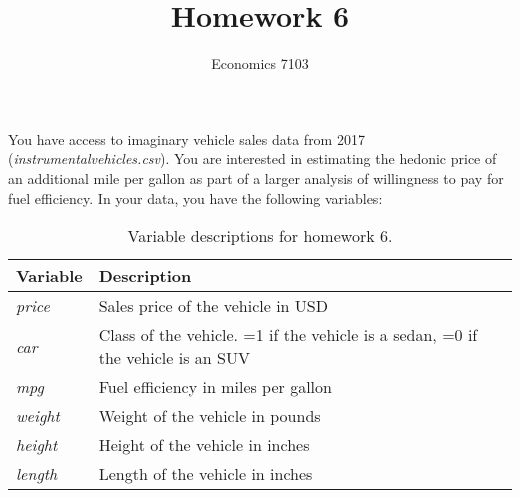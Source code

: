 \documentclass{article}
\title{Homework 6}
\author{Economics 7103}
\date{ }
\begin{document}
\maketitle

\noindent You have access to imaginary vehicle sales data from 2017 (\textit{instrumentalvehicles.csv}).  You are interested in estimating the hedonic price of an additional mile per gallon as part of a larger analysis of willingness to pay for fuel efficiency.  In your data, you have the following variables:
\begin{table}[h]
    \centering
    \begin{tabular}{l|l}
        Variable & Description \\ \hline
         \textit{price} & Sales price of the vehicle in USD  \\
         \textit{car} & Class of the vehicle. =1 if the vehicle is a sedan, =0 if the vehicle is an SUV \\
         \textit{mpg} & Fuel efficiency in miles per gallon \\
         \textit{weight} & Weight of the vehicle in pounds \\
         \textit{height} & Height of the vehicle in inches \\
         \textit{length} & Length of the vehicle in inches \\
    \end{tabular}
    \caption{Variable descriptions for homework 6.}
    \label{tab:variables6}
\end{table}
\end{document}
